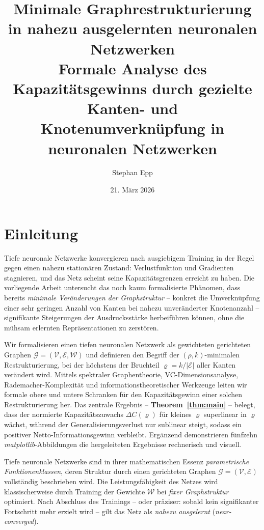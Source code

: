 ﻿\documentclass[12pt, a4paper, openany]{report}
\title{%
  \textbf{Minimale Graphrestrukturierung in nahezu ausgelernten neuronalen Netzwerken}\\
  \Large Formale Analyse des Kapazitätsgewinns durch gezielte\\
  Kanten- und Knotenumverknüpfung in neuronalen Netzwerken
}
\author{Stephan Epp}
\date{21. März 2026}
\newcommand{\calG}{\mathcal{G}}
\newcommand{\calV}{\mathcal{V}}
\newcommand{\calE}{\mathcal{E}}
\newcommand{\calW}{\mathcal{W}}
\begin{document}
\maketitle
\tableofcontents
\newpage

\chapter{Einleitung}
\label{sec:intro}
Tiefe neuronale Netzwerke konvergieren nach ausgiebigem Training in der Regel
gegen einen nahezu stationären Zustand: Verlustfunktion und Gradienten
stagnieren, und das Netz scheint seine Kapazitätsgrenzen erreicht zu haben.
Die vorliegende Arbeit untersucht das noch kaum formalisierte Phänomen, dass
bereits \emph{minimale Veränderungen der Graphstruktur} -- konkret die
Umverknüpfung einer sehr geringen Anzahl von Kanten bei nahezu unveränderter
Knotenanzahl -- signifikante Steigerungen der Ausdrucksstärke herbeiführen
können, ohne die mühsam erlernten Repräsentationen zu zerstören.

Wir formalisieren einen tiefen neuronalen Netzwerk als gewichteten gerichteten
Graphen $\calG = (\calV, \calE, \calW)$ und definieren den Begriff der
$(\rho, k)$-minimalen Restrukturierung, bei der höchstens der Bruchteil
$\varrho = k/|\calE|$ aller Kanten verändert wird.  Mittels spektraler
Graphentheorie, VC-Dimensionsanalyse, Rademacher-Komplexität und
informationstheoretischer Werkzeuge leiten wir formale obere und untere
Schranken für den Kapazitätsgewinn einer solchen Restrukturierung her.  Das
zentrale Ergebnis -- \textbf{Theorem~\ref{thm:main}} -- belegt, dass der
normierte Kapazitätszuwachs $\Delta C(\varrho)$ für kleines $\varrho$
superlinear in $\varrho$ wächst, während der Generalisierungsverlust nur
sublinear steigt, sodass ein positiver Netto-Informationsgewinn verbleibt.
Ergänzend demonstrieren fünfzehn \textit{matplotlib}-Abbildungen die
hergeleiteten Ergebnisse rechnerisch und visuell.

Tiefe neuronale Netzwerke sind in ihrer mathematischen Essenz \emph{parametrische
Funktionenklassen}, deren Struktur durch einen gerichteten Graphen
$\calG = (\calV, \calE)$ vollständig beschrieben wird.  Die Leistungsfähigkeit
des Netzes wird klassischerweise durch Training der Gewichte $\calW$ bei
\emph{fixer Graphstruktur} optimiert.  Nach Abschluss des Trainings -- oder
präziser: sobald kein signifikanter Fortschritt mehr erzielt wird -- gilt das
Netz als \emph{nahezu ausgelernt} (\textit{near-converged}).
\end{document}
